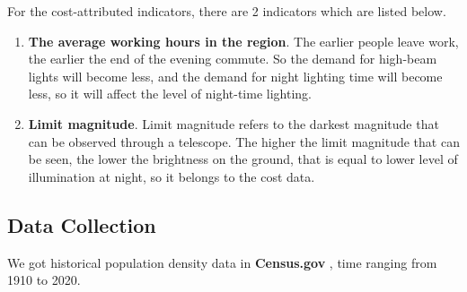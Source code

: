 For the cost-attributed indicators, there are 2 indicators which are listed below.
\begin{enumerate}
    \item \textbf{The average working hours in the region}. The earlier people leave work, the earlier the end of the evening commute. So the demand for high-beam lights will become less, and the demand for night lighting time will become less, so it will affect the level of night-time lighting.
    
    \item \textbf{Limit magnitude}. Limit magnitude refers to the darkest magnitude that can be observed through a telescope. The higher the limit magnitude that can be seen, the lower the brightness on the ground, that is equal to lower level of illumination at night, so it belongs to the cost data.
\end{enumerate}


\subsection{Data Collection}
We got historical population density data in \textbf{Census.gov} \cite{bureau_historical_nodate}, time ranging from 1910 to 2020. 
